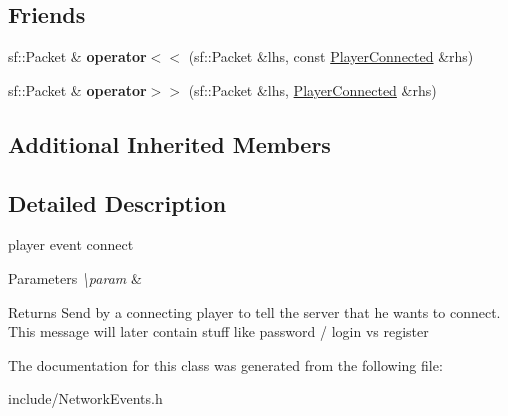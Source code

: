 \subsection*{Friends}
\begin{DoxyCompactItemize}
\item 
\hypertarget{class_player_connected_ad60e9a7caca36f2e5f6bcacac923fae5}{sf\-::\-Packet \& {\bfseries operator$<$$<$} (sf\-::\-Packet \&lhs, const \hyperlink{class_player_connected}{Player\-Connected} \&rhs)}\label{class_player_connected_ad60e9a7caca36f2e5f6bcacac923fae5}

\item 
\hypertarget{class_player_connected_a2d84fc4b49fdf642e87abaa3f7ba09a0}{sf\-::\-Packet \& {\bfseries operator$>$$>$} (sf\-::\-Packet \&lhs, \hyperlink{class_player_connected}{Player\-Connected} \&rhs)}\label{class_player_connected_a2d84fc4b49fdf642e87abaa3f7ba09a0}

\end{DoxyCompactItemize}
\subsection*{Additional Inherited Members}


\subsection{Detailed Description}
player event connect 


\begin{DoxyParams}{Parameters}
{\em \textbackslash{}param} & \\
\hline
\end{DoxyParams}
\begin{DoxyReturn}{Returns}
Send by a connecting player to tell the server that he wants to connect. This message will later contain stuff like password / login vs register 
\end{DoxyReturn}


The documentation for this class was generated from the following file\-:\begin{DoxyCompactItemize}
\item 
include/Network\-Events.\-h\end{DoxyCompactItemize}

